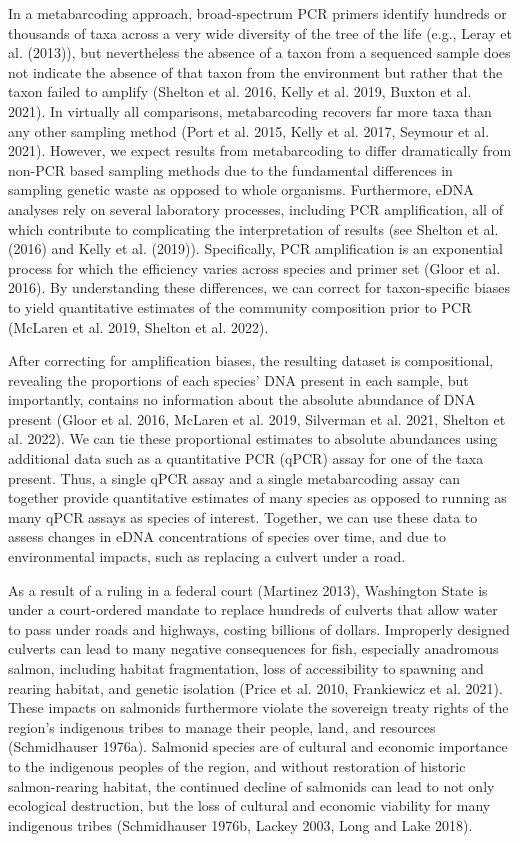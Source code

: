 \documentclass[
]{article}
\begin{document}
In a metabarcoding approach, broad-spectrum PCR primers identify
hundreds or thousands of taxa across a very wide diversity of the tree
of the life (e.g., Leray et al. (2013)), but nevertheless the absence of
a taxon from a sequenced sample does not indicate the absence of that
taxon from the environment but rather that the taxon failed to amplify
(Shelton et al. 2016, Kelly et al. 2019, Buxton et al. 2021). In
virtually all comparisons, metabarcoding recovers far more taxa than any
other sampling method (Port et al. 2015, Kelly et al. 2017, Seymour et
al. 2021). However, we expect results from metabarcoding to differ
dramatically from non-PCR based sampling methods due to the fundamental
differences in sampling genetic waste as opposed to whole organisms.
Furthermore, eDNA analyses rely on several laboratory processes,
including PCR amplification, all of which contribute to complicating the
interpretation of results (see Shelton et al. (2016) and Kelly et al.
(2019)). Specifically, PCR amplification is an exponential process for
which the efficiency varies across species and primer set (Gloor et al.
2016). By understanding these differences, we can correct for
taxon-specific biases to yield quantitative estimates of the community
composition prior to PCR (McLaren et al. 2019, Shelton et al. 2022).

After correcting for amplification biases, the resulting dataset is
compositional, revealing the proportions of each species' DNA present in
each sample, but importantly, contains no information about the absolute
abundance of DNA present (Gloor et al. 2016, McLaren et al. 2019,
Silverman et al. 2021, Shelton et al. 2022). We can tie these
proportional estimates to absolute abundances using additional data such
as a quantitative PCR (qPCR) assay for one of the taxa present. Thus, a
single qPCR assay and a single metabarcoding assay can together provide
quantitative estimates of many species as opposed to running as many
qPCR assays as species of interest. Together, we can use these data to
assess changes in eDNA concentrations of species over time, and due to
environmental impacts, such as replacing a culvert under a road.

As a result of a ruling in a federal court (Martinez 2013), Washington
State is under a court-ordered mandate to replace hundreds of culverts
that allow water to pass under roads and highways, costing billions of
dollars. Improperly designed culverts can lead to many negative
consequences for fish, especially anadromous salmon, including habitat
fragmentation, loss of accessibility to spawning and rearing habitat,
and genetic isolation (Price et al. 2010, Frankiewicz et al. 2021).
These impacts on salmonids furthermore violate the sovereign treaty
rights of the region's indigenous tribes to manage their people, land,
and resources (Schmidhauser 1976a). Salmonid species are of cultural and
economic importance to the indigenous peoples of the region, and without
restoration of historic salmon-rearing habitat, the continued decline of
salmonids can lead to not only ecological destruction, but the loss of
cultural and economic viability for many indigenous tribes (Schmidhauser
1976b, Lackey 2003, Long and Lake 2018).
\end{document}

